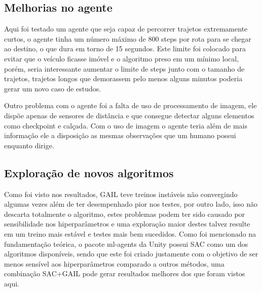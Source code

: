 \subsection*{Melhorias no agente}
Aqui foi testado um agente que seja capaz de percorrer trajetos extremamente curtos, o agente tinha um número máximo de 800 steps por rota para se chegar ao destino, o que dura em torno de 15 segundos. Este limite foi colocado para evitar que o veículo ficasse imóvel e o algoritmo preso em um mínimo local, porém, seria interessante aumentar o limite de steps junto com o tamanho de trajetos, trajetos longos que demorassem pelo menos alguns minutos poderia gerar um novo caso de estudos.

Outro problema com o agente foi a falta de uso de processamento de imagem, ele dispõe apenas de sensores de distância e que consegue detectar alguns elementos como checkpoint e calçada. Com o uso de imagem o agente teria além de mais informação ele a disposição as mesmas observações que um humano possui enquanto dirige.


\subsection*{Exploração de novos algoritmos}
Como foi visto nos resultados, GAIL teve treinos instáveis não convergindo algumas vezes além de ter desempenhado pior nos testes, por outro lado, isso não descarta totalmente o algoritmo, estes problemas podem ter sido causado por sensibilidade nos hiperparâmetros e uma exploração maior destes talvez resulte em um treino mais estável e testes mais bem sucedidos. Como foi mencionado na fundamentação teórica, o pacote ml-agents da Unity possui SAC como um dos algoritmos disponíveis, sendo que este foi criado justamente com o objetivo de ser menos sensível aos hiperparâmetros comparado a outros métodos, uma combinação SAC+GAIL pode gerar resultados melhores dos que foram vistos aqui.